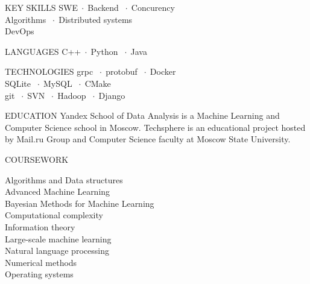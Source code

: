 \documentclass[12pt]{cutecv}
\author{Svyatoslav Feldsherov}
\newcommand{\listbullet}{$\; \cdot \;$}
\begin{document}
\maketitle

\begin{paracol}{2}
\setlength{\columnsep}{2em}
\setlength{\cvsectionverticalskip}{1mm}
\setlength{\cvinfoverticalskip}{1mm}

\begin{leftcolumn}
\begin{cvsection}{KEY SKILLS}
   SWE\listbullet Backend \listbullet Concurency \\
   Algorithms \listbullet Distributed systems \\
   DevOps
\end{cvsection}

\begin{cvsection}{LANGUAGES}
  C++\listbullet Python \listbullet Java
\end{cvsection}

\begin{cvsection}{TECHNOLOGIES}
  grpc \listbullet protobuf \listbullet Docker \\
  SQLite \listbullet MySQL \listbullet CMake \\
  git \listbullet SVN  \listbullet Hadoop \listbullet Django \\
\end{cvsection}

\begin{cvsection}{EDUCATION}
    {Yandex School of Data Analysis is a Machine Learning
     and Computer Science school in Moscow.}
   {Techsphere is an educational project hosted
    by Mail.ru Group and Computer Science faculty
    at Moscow State University.}
\end{cvsection}


\begin{cvsection}{COURSEWORK}

  {\HLight
    Algorithms and Data structures\\
    Advanced Machine Learning\\
    Bayesian Methods for Machine Learning\\
    Computational complexity\\
    Information theory\\
    Large-scale machine learning\\
    Natural language processing\\
    Numerical methods\\
    Operating systems\\
  }
\end{cvsection}


\end{leftcolumn}
\end{paracol}
\end{document}
